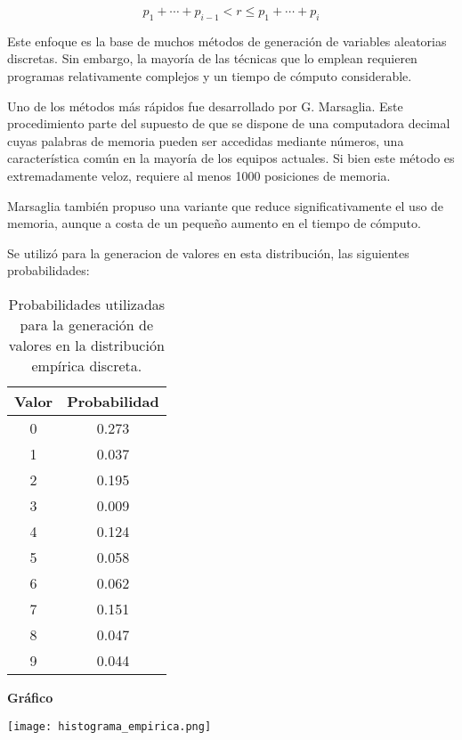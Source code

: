 \documentclass[11pt]{article}
\begin{document}
\begin{equation}
p_1 + \cdots + p_{i-1} < r \leq p_1 + \cdots + p_i
\end{equation}


Este enfoque es la base de muchos métodos de generación de variables aleatorias discretas. Sin embargo, la mayoría de las técnicas que lo emplean requieren programas relativamente complejos y un tiempo de cómputo considerable.

Uno de los métodos más rápidos fue desarrollado por G. Marsaglia. Este procedimiento parte del supuesto de que se dispone de una computadora decimal cuyas palabras de memoria pueden ser accedidas mediante números, una característica común en la mayoría de los equipos actuales. Si bien este método es extremadamente veloz, requiere al menos 1000 posiciones de memoria.

Marsaglia también propuso una variante que reduce significativamente el uso de memoria, aunque a costa de un pequeño aumento en el tiempo de cómputo.

Se utilizó para la generacion de valores en esta distribución, las siguientes probabilidades:

\begin{table}[H]
\centering
\begin{tabular}{|c|c|}
\hline
\textbf{Valor} & \textbf{Probabilidad} \\
\hline
0 & 0.273 \\
1 & 0.037 \\
2 & 0.195 \\
3 & 0.009 \\
4 & 0.124 \\
5 & 0.058 \\
6 & 0.062 \\
7 & 0.151 \\
8 & 0.047 \\
9 & 0.044 \\
\hline
\end{tabular}
\caption{Probabilidades utilizadas para la generación de valores en la distribución empírica discreta.}
\label{tab:empirica}
\end{table}

\noindent\textbf{Gráfico\newline}
\begin{center}
\texttt{[image: histograma\_empirica.png]}

\end{center}
\end{document}
